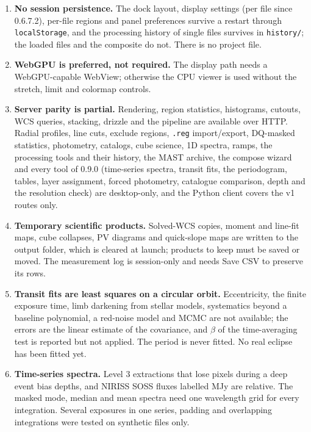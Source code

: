 \documentclass[11pt,a4paper]{article}
\newcommand{\code}[1]{\texttt{\small #1}}
\begin{document}
\begin{enumerate}[nosep]
    \item \textbf{No session persistence.} The dock layout, display settings (per file since 0.6.7.2), per-file regions and panel preferences survive a restart through \code{localStorage}, and the processing history of single files survives in \code{history/}; the loaded files and the composite do not. There is no project file.
    \item \textbf{WebGPU is preferred, not required.} The display path needs a WebGPU-capable WebView; otherwise the CPU viewer is used without the stretch, limit and colormap controls.
    \item \textbf{Server parity is partial.} Rendering, region statistics, histograms, cutouts, WCS queries, stacking, drizzle and the pipeline are available over HTTP. Radial profiles, line cuts, exclude regions, \code{.reg} import/export, DQ-masked statistics, photometry, catalogs, cube science, 1D spectra, ramps, the processing tools and their history, the MAST archive, the compose wizard and every tool of 0.9.0 (time-series spectra, transit fits, the periodogram, tables, layer assignment, forced photometry, catalogue comparison, depth and the resolution check) are desktop-only, and the Python client covers the v1 routes only.
    \item \textbf{Temporary scientific products.} Solved-WCS copies, moment and line-fit maps, cube collapses, PV diagrams and quick-slope maps are written to the output folder, which is cleared at launch; products to keep must be saved or moved. The measurement log is session-only and needs Save CSV to preserve its rows.
    \item \textbf{Transit fits are least squares on a circular orbit.} Eccentricity, the finite exposure time, limb darkening from stellar models, systematics beyond a baseline polynomial, a red-noise model and MCMC are not available; the errors are the linear estimate of the covariance, and $\beta$ of the time-averaging test is reported but not applied. The period is never fitted. No real eclipse has been fitted yet.
    \item \textbf{Time-series spectra.} Level 3 extractions that lose pixels during a deep event bias depths, and NIRISS SOSS fluxes labelled MJy are relative. The masked mode, median and mean spectra need one wavelength grid for every integration. Several exposures in one series, padding and overlapping integrations were tested on synthetic files only.

\end{enumerate}
\end{document}
